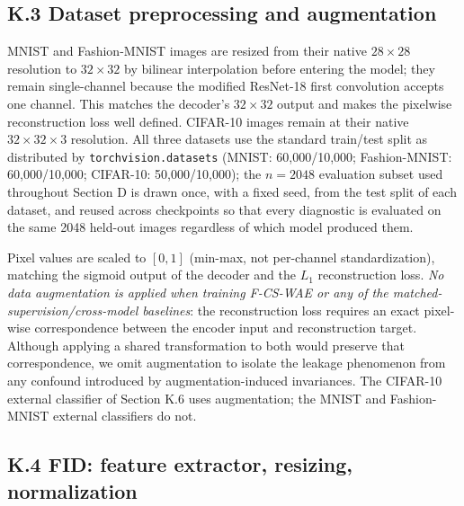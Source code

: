 \documentclass[letterpaper]{article}
\newcommand{\ours}{F-CS-WAE}
\begin{document}
\subsection{K.3 Dataset preprocessing and augmentation}

MNIST and Fashion-MNIST images are resized from their native $28\times28$
resolution to $32\times32$ by bilinear interpolation before entering the
model; they remain single-channel because the modified ResNet-18 first
convolution accepts one channel. This matches the decoder's $32\times32$
output and makes the pixelwise reconstruction loss well defined. CIFAR-10
images remain at their native $32\times32\times3$ resolution. All three
datasets use the standard train/test split as
distributed by \texttt{torchvision.datasets} (MNIST: 60,000/10,000;
Fashion-MNIST: 60,000/10,000; CIFAR-10: 50,000/10,000); the $n{=}2048$
evaluation subset used throughout Section D is drawn once, with a fixed seed,
from the test split of each dataset, and reused across checkpoints so that
every diagnostic is evaluated on the same 2048 held-out images regardless of
which model produced them.

Pixel values are scaled to $[0,1]$ (min-max, not per-channel standardization),
matching the sigmoid output of the decoder and the $L_1$ reconstruction loss.
\emph{No data augmentation is applied when training \ours{} or any of the
matched-supervision/cross-model baselines}: the reconstruction loss requires
an exact pixel-wise correspondence between the encoder input and reconstruction
target. Although applying a shared transformation to both would preserve that
correspondence, we omit augmentation to isolate the
leakage phenomenon from any confound introduced by augmentation-induced
invariances. The CIFAR-10 external classifier of Section K.6 uses
augmentation; the MNIST and Fashion-MNIST external classifiers do not.

\subsection{K.4 FID: feature extractor, resizing, normalization}
\end{document}
